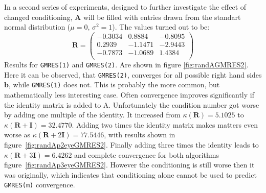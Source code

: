 In a second series of experiments, designed to further investigate the effect of changed conditioning, $\mathbf{A}$ will be filled with entries drawn from the standart normal distribution ($\mu = 0$, $\sigma^2 = 1$). The values turned out to be:
\begin{equation}
\mathbf{R} = \begin{pmatrix}
-0.3034 &   0.8884 &  -0.8095 \\
 0.2939 &  -1.1471 &  -2.9443 \\
-0.7873 &  -1.0689 &   1.4384 \\
\end{pmatrix} 
\end{equation}
Results for \texttt{GMRES(1)} and \texttt{GMRES(2)}. Are shown in figure \ref{fig:randAGMRES2}. Here it can be observed, that \texttt{GMRES(2)}, converges for all possible right hand sides $\mathbf{b}$, while \texttt{GMRES(1)} does not. This is probably the more common, but mathematically less interesting case. Often convergence improves significantly if the identity matrix is added to A. Unfortunately the condition number got worse by adding one multiple of the identity. It increased from $\kappa(\mathbf{R})=5.1025$ to $\kappa(\mathbf{R} + \mathbf{I})=32.4770$. Adding two times the identity matrix makes matters even worse as $\kappa(\mathbf{R} + 2\mathbf{I})=77.5446$, with results shown in figure~\ref{fig:randAp2eyeGMRES2}. Finally adding three times the identity leads to $\kappa(\mathbf{R} + 3\mathbf{I})=6.4262$ and complete convergence for both algorithms figure~\ref{fig:randAp3eyeGMRES2}. However the conditioning is still worse then it was originally, which indicates that conditioning alone cannot be used to predict \texttt{GMRES(m)} convergence. 

